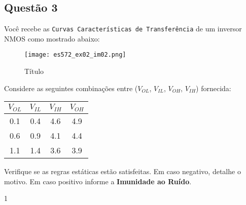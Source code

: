 \documentclass{article}
\begin{document}
        \subsection{Questão 3}
            \begin{exercise}
                Você recebe as \texttt{Curvas Características de Transferência} de um inversor NMOS como mostrado abaixo:
                    \begin{figure}[H]
                        \centering
                        \texttt{[image: es572\_ex02\_im02.png]}
                        \caption{Título}
                    \end{figure} \noindent
                Considere as seguintes combinações entre ($V_{OL}$, $V_{IL}$, $V_{OH}$, $V_{IH}$) fornecida:
                    \begin{table}[H]
                        \centering  
                        \begin{tabular}[]{cccc}\hline
                            $V_{OL}$ & $V_{IL}$ & $V_{IH}$ & $V_{OH}$\\\hline
                            0.1      & 0.4      & 4.6      & 4.9\\
                            0.6      & 0.9      & 4.1      & 4.4\\
                            1.1      & 1.4      & 3.6      & 3.9\\\hline
                        \end{tabular}
                    \end{table}
                Verifique se as regras estáticas estão satisfeitas. Em caso negativo, detalhe o motivo. Em caso positivo informe a \textbf{Imunidade ao Ruído}.
            \end{exercise}

            \begin{resolution}
                1
            \end{resolution}

\newpage
\end{document}
